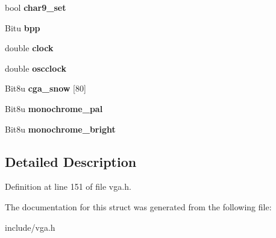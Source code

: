 \begin{DoxyCompactItemize}
\item 
\hypertarget{structVGA__Draw_abaa2681be86bf5437d6a0923e35eb105}{bool {\bfseries char9\-\_\-set}}\label{structVGA__Draw_abaa2681be86bf5437d6a0923e35eb105}

\item 
\hypertarget{structVGA__Draw_a6e0453a000b7fa89a66becfd79a9901c}{Bitu {\bfseries bpp}}\label{structVGA__Draw_a6e0453a000b7fa89a66becfd79a9901c}

\item 
\hypertarget{structVGA__Draw_a6025d548974fd43c733ffd89f080d9e5}{double {\bfseries clock}}\label{structVGA__Draw_a6025d548974fd43c733ffd89f080d9e5}

\item 
\hypertarget{structVGA__Draw_a3beadf0a22d03d9a78cace90b3b5092e}{double {\bfseries oscclock}}\label{structVGA__Draw_a3beadf0a22d03d9a78cace90b3b5092e}

\item 
\hypertarget{structVGA__Draw_a427d28481b72ec7e7c0a8c8b79d62bf2}{Bit8u {\bfseries cga\-\_\-snow} \mbox{[}80\mbox{]}}\label{structVGA__Draw_a427d28481b72ec7e7c0a8c8b79d62bf2}

\item 
\hypertarget{structVGA__Draw_a8fcdb9fc31b48f2169767117002829bf}{Bit8u {\bfseries monochrome\-\_\-pal}}\label{structVGA__Draw_a8fcdb9fc31b48f2169767117002829bf}

\item 
\hypertarget{structVGA__Draw_a7b62f524653b2e1bbf158237edb1c95d}{Bit8u {\bfseries monochrome\-\_\-bright}}\label{structVGA__Draw_a7b62f524653b2e1bbf158237edb1c95d}

\end{DoxyCompactItemize}


\subsection{Detailed Description}


Definition at line 151 of file vga.\-h.



The documentation for this struct was generated from the following file\-:\begin{DoxyCompactItemize}
\item 
include/vga.\-h\end{DoxyCompactItemize}

